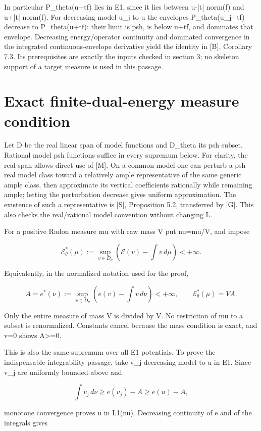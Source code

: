 \documentclass[11pt]{article}
\begin{document}
In particular P\_theta(u+tf) lies in E1, since it lies between u-|t| norm(f) and u+|t| norm(f). For decreasing model u\_j to u the envelopes P\_theta(u\_j+tf) decrease to P\_theta(u+tf): their limit is psh, is below u+tf, and dominates that envelope. Decreasing energy/operator continuity and dominated convergence in the integrated continuous-envelope derivative yield the identity in [B], Corollary 7.3. Its prerequisites are exactly the inputs checked in section 3; no skeleton support of a target measure is used in this passage.

\section{Exact finite-dual-energy measure condition}

Let D be the real linear span of model functions and D\_theta its psh subset. Rational model psh functions suffice in every supremum below. For clarity, the real span allows direct use of [M]. On a common model one can perturb a psh real model class toward a relatively ample representative of the same generic ample class, then approximate its vertical coefficients rationally while remaining ample; letting the perturbation decrease gives uniform approximation. The existence of such a representative is [S], Proposition 5.2, transferred by [G]. This also checks the real/rational model convention without changing L.

For a positive Radon measure mu with raw mass V put nu=mu/V, and impose

\[
\mathcal E^*_\theta(\mu):=
\sup_{v\in D_\theta}\left(\mathcal E(v)-\int v\,d\mu\right)<+\infty.
\]

Equivalently, in the normalized notation used for the proof,

\[
A=e^*(\nu):=\sup_{v\in D_\theta}\left(e(v)-\int v\,d\nu\right)<+\infty,
\qquad\mathcal E^*_\theta(\mu)=VA.
\]

Only the entire measure of mass V is divided by V. No restriction of mu to a subset is renormalized. Constants cancel because the mass condition is exact, and v=0 shows A\textgreater{}=0.

This is also the same supremum over all E1 potentials. To prove the indispensable integrability passage, take v\_j decreasing model to u in E1. Since v\_j are uniformly bounded above and

\[
\int v_j\,d\nu\geq e(v_j)-A\geq e(u)-A,
\]

monotone convergence proves u in L1(nu). Decreasing continuity of e and of the integrals gives
\end{document}
